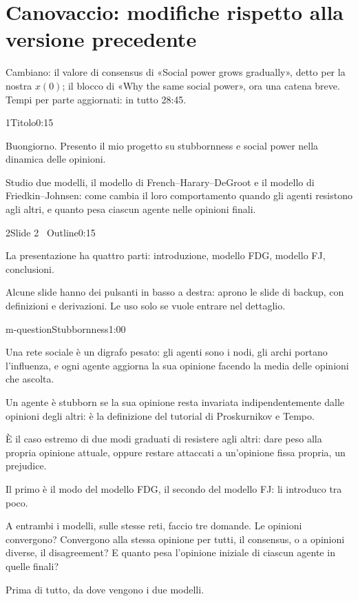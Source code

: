 \section*{Canovaccio: modifiche rispetto alla versione precedente}
Cambiano: il valore di consensus di «Social power grows gradually», detto per la nostra $x(0)$; il blocco di «Why the same social power», ora una catena breve. Tempi per parte aggiornati: in tutto 28:45.
\begin{slidepag}{1}{Titolo}{0:15}
  \begin{discorso}
    \item Buongiorno. Presento il mio progetto su stubbornness e social power nella dinamica delle opinioni.
    \item Studio due modelli, il modello di French–Harary–DeGroot e il modello di Friedkin–Johnsen: come cambia il loro comportamento quando gli agenti resistono agli altri, e quanto pesa ciascun agente nelle opinioni finali.
  \end{discorso}
\end{slidepag}

\begin{slidepag}{2}{Slide 2 \textperiodcentered\ Outline}{0:15}
  \begin{discorso}
    \item La presentazione ha quattro parti: introduzione, modello FDG, modello FJ, conclusioni.
    \item Alcune slide hanno dei pulsanti in basso a destra: aprono le slide di backup, con definizioni e derivazioni. Le uso solo se vuole entrare nel dettaglio.
  \end{discorso}
\end{slidepag}

\begin{slide}{m-question}{Stubbornness}{1:00}
  \begin{discorso}
    \item Una rete sociale è un digrafo pesato: gli agenti sono i nodi, gli archi portano l'influenza, e ogni agente aggiorna la sua opinione facendo la media delle opinioni che ascolta.
    \item Un agente è stubborn se la sua opinione resta invariata indipendentemente dalle opinioni degli altri: è la definizione del tutorial di Proskurnikov e Tempo.
    \item È il caso estremo di due modi graduati di resistere agli altri: dare peso alla propria opinione attuale, oppure restare attaccati a un'opinione fissa propria, un prejudice.
    \item Il primo è il modo del modello FDG, il secondo del modello FJ: li introduco tra poco.
    \item A entrambi i modelli, sulle stesse reti, faccio tre domande. Le opinioni convergono? Convergono alla stessa opinione per tutti, il consensus, o a opinioni diverse, il disagreement? E quanto pesa l'opinione iniziale di ciascun agente in quelle finali?
    \item Prima di tutto, da dove vengono i due modelli.
  \end{discorso}
\end{slide}

